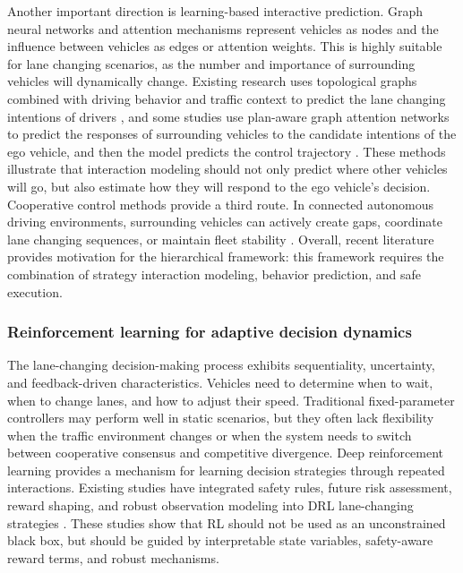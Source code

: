 Another important direction is learning-based interactive prediction. Graph neural networks and attention mechanisms represent vehicles as nodes and the influence between vehicles as edges or attention weights. This is highly suitable for lane changing scenarios, as the number and importance of surrounding vehicles will dynamically change. Existing research uses topological graphs combined with driving behavior and traffic context to predict the lane changing intentions of drivers \cite{R5}, and some studies use plan-aware graph attention networks to predict the responses of surrounding vehicles to the candidate intentions of the ego vehicle, and then the model predicts the control trajectory \cite{R6}. These methods illustrate that interaction modeling should not only predict where other vehicles will go, but also estimate how they will respond to the ego vehicle's decision. Cooperative control methods provide a third route. In connected autonomous driving environments, surrounding vehicles can actively create gaps, coordinate lane changing sequences, or maintain fleet stability \cite{R7,R8}. Overall, recent literature provides motivation for the hierarchical framework: this framework requires the combination of strategy interaction modeling, behavior prediction, and safe execution.



\subsubsection{Reinforcement learning for adaptive decision dynamics}





The lane-changing decision-making process exhibits sequentiality, uncertainty, and feedback-driven characteristics. Vehicles need to determine when to wait, when to change lanes, and how to adjust their speed. Traditional fixed-parameter controllers may perform well in static scenarios, but they often lack flexibility when the traffic environment changes or when the system needs to switch between cooperative consensus and competitive divergence. Deep reinforcement learning provides a mechanism for learning decision strategies through repeated interactions. Existing studies have integrated safety rules, future risk assessment, reward shaping, and robust observation modeling into DRL lane-changing strategies \cite{R9,R10,R11}. These studies show that RL should not be used as an unconstrained black box, but should be guided by interpretable state variables, safety-aware reward terms, and robust mechanisms.




